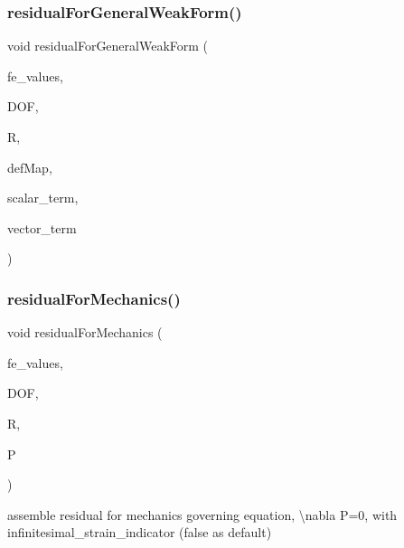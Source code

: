 \mbox{\label{class_residual_a478a5fee7d75f3a16707ad5915a34d3f}} 
\subsubsection{\texorpdfstring{residualForGeneralWeakForm()}{residualForGeneralWeakForm()}\hspace{0.1cm}{\footnotesize\ttfamily [2/2]}}
{\footnotesize\ttfamily void residual\+For\+General\+Weak\+Form (\begin{DoxyParamCaption}\item[{const F\+E\+Values$<$ dim $>$ \&}]{fe\+\_\+values,  }\item[{unsigned int}]{D\+OF,  }\item[{dealii\+::\+Table$<$ 1, T $>$ \&}]{R,  }\item[{\mbox{\hyperlink{structdeformation_map}{deformation\+Map}}$<$ T, dim $>$ \&}]{def\+Map,  }\item[{dealii\+::\+Table$<$ 1, T $>$ \&}]{scalar\+\_\+term,  }\item[{dealii\+::\+Table$<$ 2, T $>$ \&}]{vector\+\_\+term }\end{DoxyParamCaption})}

\mbox{\label{class_residual_a432fe02216f182fd241f09775131f854}} 
\subsubsection{\texorpdfstring{residualForMechanics()}{residualForMechanics()}}
{\footnotesize\ttfamily void residual\+For\+Mechanics (\begin{DoxyParamCaption}\item[{const F\+E\+Values$<$ dim $>$ \&}]{fe\+\_\+values,  }\item[{unsigned int}]{D\+OF,  }\item[{Table$<$ 1, T $>$ \&}]{R,  }\item[{dealii\+::\+Table$<$ 3, T $>$}]{P }\end{DoxyParamCaption})}

assemble residual for mechanics governing equation, \textbackslash{}nabla P=0, with infinitesimal\+\_\+strain\+\_\+indicator (false as default) \mbox{\label{class_residual_a34f1f680e957e21ac47c35f404e9fd6a}} 
